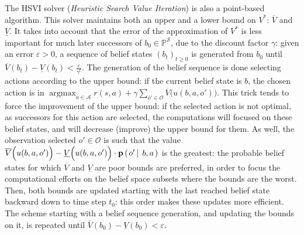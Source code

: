 The HSVI solver (\textit{Heuristic Search Value Iteration}) \cite{Smith:2004:HSV:1036843.1036906} is also a point-based algorithm.
This solver maintains both an upper and a lower bound on $V^*$: $\overline{V}$ and $\underline{V}$.
It takes into account that the error of the approximation of $V^*$ 
is less important for much later successors of $b_0 \in \mathbb{P}^{\mathcal{S}}$,
due to the discount factor $\gamma$:
given an error $\varepsilon>0$, a sequence of belief states $(b_t)_{t\geqslant0}$ is generated
from $b_0$ until $\overline{V}(b_t) - \underline{V}(b_t) < \frac{\varepsilon}{\gamma^t}$. 
The generation of the belief sequence is done selecting actions 
according to the upper bound: if the current belief state is $b$, the chosen action is in
$\operatorname*{argmax}_{a \in \mathcal{A}} r(s,a) + \gamma \sum_{o' \in \mathcal{O}} \overline{V}\Big(u(b,a,o')\Big)$.
This trick tends to force the improvement of the upper bound: if the selected action is not optimal,
as successors for this action are selected, the computations will focused on
these belief states, and will decrease (improve) the upper bound for them.
As well, the observation selected $o' \in \mathcal{O}$ is such that 
the value $\overline{V}\Big(u(b,a,o')\Big) - \underline{V}\Big(u(b,a,o')\Big) \cdot \textbf{p} \left( \left.  o' \, \right| \left. \, b, a  \right. \right)$ is the greatest:
the probable belief states for which $\overline{V}$ and $\underline{V}$
are poor bounds are preferred, in order to focus the computational efforts
on the belief space subsets where the bounds are the worst. 
Then, both bounds are updated starting with the last reached belief state
backward down to time step $t_0$: this order makes these updates more efficient.
The scheme starting with a belief sequence generation, and updating the bounds on it,
is repeated until $\overline{V}(b_0) - \underline{V}(b_0) < \varepsilon$.

